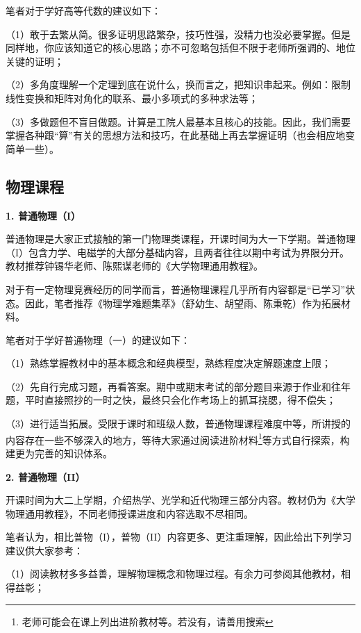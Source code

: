 \documentclass[11pt,oneside]{book}
\begin{document}
\vspace{20pt}

笔者对于学好高等代数的建议如下：

（1）敢于去繁从简。很多证明思路繁杂，技巧性强，没精力也没必要掌握。但是同样地，你应该知道它的核心思路；亦不可忽略包括但不限于老师所强调的、地位关键的证明；

（2）多角度理解一个定理到底在说什么，换而言之，把知识串起来。例如：限制线性变换和矩阵对角化的联系、最小多项式的多种求法等；

（3）多做题但不盲目做题。计算是工院人最基本且核心的技能。因此，我们需要掌握各种跟“算”有关的思想方法和技巧，在此基础上再去掌握证明（也会相应地变简单一些）。

\subsection{物理课程}
\textbf{1. 普通物理（I）}

普通物理是大家正式接触的第一门物理类课程，开课时间为大一下学期。普通物理（I）包含力学、电磁学的大部分基础内容，且两者往往以期中考试为界限分开。教材推荐钟锡华老师、陈熙谋老师的《大学物理通用教程》。

对于有一定物理竞赛经历的同学而言，普通物理课程几乎所有内容都是“已学习”状态。因此，笔者推荐《物理学难题集萃》（舒幼生、胡望雨、陈秉乾）作为拓展材料。

\vspace{20pt}

笔者对于学好普通物理（一）的建议如下：

（1）熟练掌握教材中的基本概念和经典模型，熟练程度决定解题速度上限；

（2）先自行完成习题，再看答案。期中或期末考试的部分题目来源于作业和往年题，平时直接照抄的一时之快，最终只会化作考场上的抓耳挠腮，得不偿失；

（3）进行适当拓展。受限于课时和班级人数，普通物理课程难度中等，所讲授的内容存在一些不够深入的地方，等待大家通过阅读进阶材料\footnote{老师可能会在课上列出进阶教材等。若没有，请善用搜索}等方式自行探索，构建更为完善的知识体系。

\vspace{20pt}

\textbf{2. 普通物理（II）}

开课时间为大二上学期，介绍热学、光学和近代物理三部分内容。教材仍为《大学物理通用教程》，不同老师授课进度和内容选取不尽相同。

笔者认为，相比普物（I），普物（II）内容更多、更注重理解，因此给出下列学习建议供大家参考：

（1）阅读教材多多益善，理解物理概念和物理过程。有余力可参阅其他教材，相得益彰；
\end{document}
